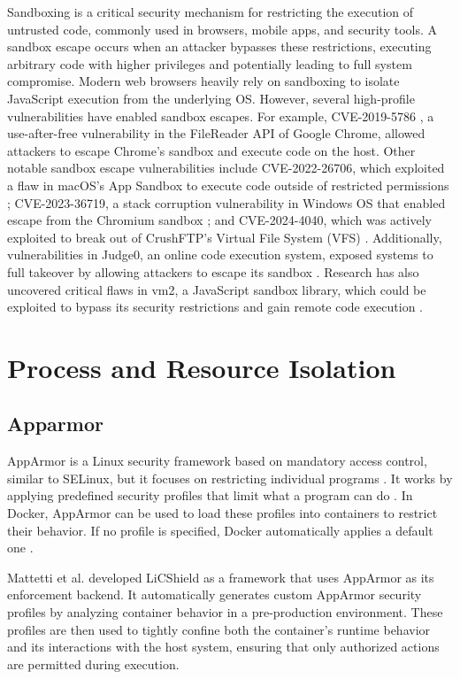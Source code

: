 \begin{doublespace}
Sandboxing is a critical security mechanism for restricting the execution of untrusted code, commonly used in browsers, mobile apps, and security tools. A sandbox escape occurs when an attacker bypasses these restrictions, executing arbitrary code with higher privileges and potentially leading to full system compromise. Modern web browsers heavily rely on sandboxing to isolate JavaScript execution from the underlying OS. However, several high-profile vulnerabilities have enabled sandbox escapes. For example, CVE-2019-5786 \cite{chromezeroday}, a use-after-free vulnerability in the FileReader API of Google Chrome, allowed attackers to escape Chrome's sandbox and execute code on the host. Other notable sandbox escape vulnerabilities include CVE-2022-26706, which exploited a flaw in macOS's App Sandbox to execute code outside of restricted permissions \cite{macossandboxescape}; CVE-2023-36719, a stack corruption vulnerability in Windows OS that enabled escape from the Chromium sandbox \cite{chromiumsandboxescape}; and CVE-2024-4040, which was actively exploited to break out of CrushFTP’s Virtual File System (VFS) \cite{crushftpsandboxescape}. Additionally, vulnerabilities in Judge0, an online code execution system, exposed systems to full takeover by allowing attackers to escape its sandbox \cite{judge0sandboxescape}. Research has also uncovered critical flaws in vm2, a JavaScript sandbox library, which could be exploited to bypass its security restrictions and gain remote code execution \cite{vm2sandboxescape}.

\section{Process and Resource Isolation}

\subsection{Apparmor}

AppArmor is a Linux security framework based on mandatory access control, similar to SELinux, but it focuses on restricting individual programs \cite{zhu2021lic}. It works by applying predefined security profiles that limit what a program can do \cite{zhu2021lic}. In Docker, AppArmor can be used to load these profiles into containers to restrict their behavior. If no profile is specified, Docker automatically applies a default one \cite{zhu2021lic}.

Mattetti et al. \cite{mattetti2015securing} developed LiCShield as a framework that uses AppArmor as its enforcement backend. It automatically generates custom AppArmor security profiles by analyzing container behavior in a pre-production environment. These profiles are then used to tightly confine both the container’s runtime behavior and its interactions with the host system, ensuring that only authorized actions are permitted during execution.


\end{doublespace}
